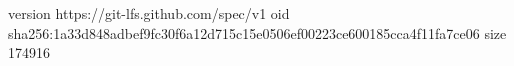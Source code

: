 version https://git-lfs.github.com/spec/v1
oid sha256:1a33d848adbef9fc30f6a12d715c15e0506ef00223ce600185cca4f11fa7ce06
size 174916
